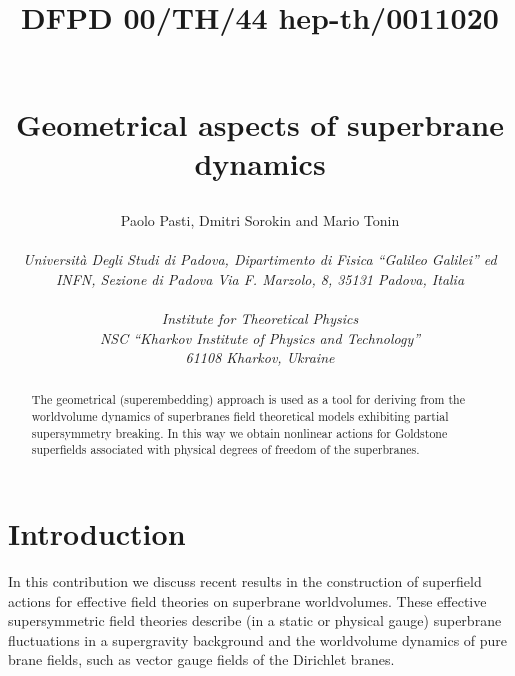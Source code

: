 \documentclass[a4paper,12pt]{article}
\begin{document}
\title{
\begin{flushright}
{{\small {DFPD 00/TH/44
\vskip-0.5cm
 hep-th/0011020}}}
\end{flushright}
~\\
{\bf Geometrical aspects of superbrane dynamics}
}

\bigskip
\author{Paolo Pasti\coordHE{}, Dmitri Sorokin\coordHE{} and Mario
Tonin\coordHE{}\\
~\\
{\coordHE{} \it Universit\`a Degli Studi di Padova,
Dipartimento di Fisica ``Galileo Galilei'' ed}\\
{\it INFN, Sezione di Padova Via F. Marzolo, 8, 35131 Padova,
Italia}\\
~\\
{\coordHE{} \it Institute for Theoretical Physics}\\
{\it NSC ``Kharkov Institute of Physics and Technology''}\\
{\it 61108 Kharkov, Ukraine} }
\date{}


\maketitle
\thispagestyle{empty}


\begin{abstract}
The geometrical (superembedding) approach is used as a tool for
deriving from the worldvolume dynamics of superbranes field
theoretical models exhibiting partial supersymmetry breaking. In
this way we obtain nonlinear actions for Goldstone superfields
associated with physical degrees of freedom of the superbranes.
\end{abstract}

\newpage
\section{Introduction}
In this contribution we discuss recent results in the construction
of superfield actions for effective field theories on superbrane
worldvolumes. These effective supersymmetric field theories
describe (in a static or physical gauge) superbrane fluctuations
in a supergravity background and the worldvolume dynamics of pure
brane fields, such as vector gauge fields of the Dirichlet branes.
\end{document}
